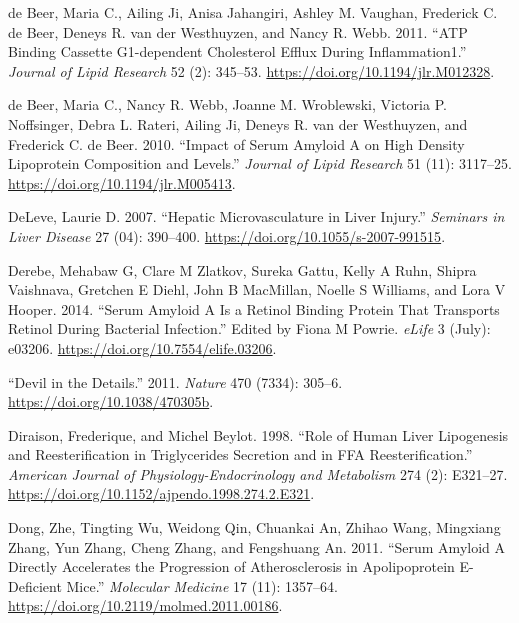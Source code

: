 \documentclass[9pt,lineno]{elife}
\newlength{\cslhangindent}
\newlength{\cslentryspacingunit} %
\newenvironment{CSLReferences}[2] %
 {%
  \setlength{\parindent}{0pt}
  \ifodd #1
  \let\oldpar\par
  \def\par{\hangindent=\cslhangindent\oldpar}
  \fi
  \setlength{\parskip}{#2\cslentryspacingunit}
 }%
 {}
\begin{document}
\begin{CSLReferences}{1}{0}
\leavevmode{}%
de Beer, Maria C., Ailing Ji, Anisa Jahangiri, Ashley M. Vaughan, Frederick C. de Beer, Deneys R. van der Westhuyzen, and Nancy R. Webb. 2011. {``{ATP} Binding Cassette {G1-dependent} Cholesterol Efflux During Inflammation1.''} \emph{Journal of Lipid Research} 52 (2): 345--53. \url{https://doi.org/10.1194/jlr.M012328}.

\leavevmode{}%
de Beer, Maria C., Nancy R. Webb, Joanne M. Wroblewski, Victoria P. Noffsinger, Debra L. Rateri, Ailing Ji, Deneys R. van der Westhuyzen, and Frederick C. de Beer. 2010. {``Impact of Serum Amyloid {A} on High Density Lipoprotein Composition and Levels.''} \emph{Journal of Lipid Research} 51 (11): 3117--25. \url{https://doi.org/10.1194/jlr.M005413}.

\leavevmode{}%
DeLeve, Laurie D. 2007. {``Hepatic {Microvasculature} in {Liver Injury}.''} \emph{Seminars in Liver Disease} 27 (04): 390--400. \url{https://doi.org/10.1055/s-2007-991515}.

\leavevmode{}%
Derebe, Mehabaw G, Clare M Zlatkov, Sureka Gattu, Kelly A Ruhn, Shipra Vaishnava, Gretchen E Diehl, John B MacMillan, Noelle S Williams, and Lora V Hooper. 2014. {``Serum Amyloid {A} Is a Retinol Binding Protein That Transports Retinol During Bacterial Infection.''} Edited by Fiona M Powrie. \emph{eLife} 3 (July): e03206. \url{https://doi.org/10.7554/elife.03206}.

\leavevmode{}%
{``Devil in the Details.''} 2011. \emph{Nature} 470 (7334): 305--6. \url{https://doi.org/10.1038/470305b}.

\leavevmode{}%
Diraison, Frederique, and Michel Beylot. 1998. {``Role of Human Liver Lipogenesis and Reesterification in Triglycerides Secretion and in {FFA} Reesterification.''} \emph{American Journal of Physiology-Endocrinology and Metabolism} 274 (2): E321--27. \url{https://doi.org/10.1152/ajpendo.1998.274.2.E321}.

\leavevmode{}%
Dong, Zhe, Tingting Wu, Weidong Qin, Chuankai An, Zhihao Wang, Mingxiang Zhang, Yun Zhang, Cheng Zhang, and Fengshuang An. 2011. {``Serum {Amyloid A Directly Accelerates} the {Progression} of {Atherosclerosis} in {Apolipoprotein E-Deficient Mice}.''} \emph{Molecular Medicine} 17 (11): 1357--64. \url{https://doi.org/10.2119/molmed.2011.00186}.


\end{CSLReferences}
\end{document}
